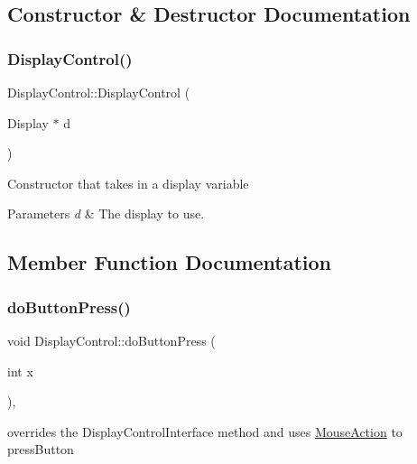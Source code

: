\subsection{Constructor \& Destructor Documentation}
\mbox{\label{classDisplayControl_a4d2a5053b250bbd1f3103795cb29fcde}} 
\subsubsection{\texorpdfstring{Display\+Control()}{DisplayControl()}}
{\footnotesize\ttfamily Display\+Control\+::\+Display\+Control (\begin{DoxyParamCaption}\item[{Display $\ast$}]{d }\end{DoxyParamCaption})}

Constructor that takes in a display variable


\begin{DoxyParams}{Parameters}
{\em d} & The display to use. \\
\hline
\end{DoxyParams}


\subsection{Member Function Documentation}
\mbox{\label{classDisplayControl_a5f45c36e699afa1d56b2af78e5125aca}} 
\subsubsection{\texorpdfstring{do\+Button\+Press()}{doButtonPress()}}
{\footnotesize\ttfamily void Display\+Control\+::do\+Button\+Press (\begin{DoxyParamCaption}\item[{int}]{x }\end{DoxyParamCaption})\hspace{0.3cm}{\ttfamily [override]}, {\ttfamily [virtual]}}

overrides the Display\+Control\+Interface method and uses \hyperlink{classMouseAction}{Mouse\+Action} to press\+Button 

